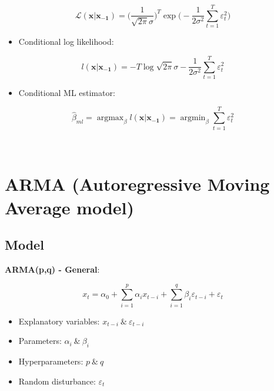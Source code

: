 \documentclass[
]{book}
\providecommand{\tightlist}{%
  \setlength{\itemsep}{0pt}\setlength{\parskip}{0pt}}
\begin{document}
\[\begin{equation*}
        \mathcal{L}(\bm{x|x_{-1}})=\bigg(\frac{1}{\sqrt{2\pi}\sigma}\bigg)^T\exp{\bigg(-\frac{1}{2\sigma^2}\sum_{t=1}^T{\varepsilon_t^2}\bigg)}
    \end{equation*}\]

\begin{itemize}
\tightlist
\item
  Conditional log likelihood:
\end{itemize}

\[\begin{equation*}
        l(\bm{x|x_{-1}})=-T\log{\sqrt{2\pi}\sigma}-\frac{1}{2\sigma^2}\sum_{t=1}^T{\varepsilon_t^2}
    \end{equation*}\]

\begin{itemize}
\tightlist
\item
  Conditional ML estimator:
\end{itemize}

\[\begin{equation*}
        \hat{\beta}_{ml}=\mathop{\mathrm{argmax}}_\beta{l(\bm{x|x_{-1}})}=\mathop{\mathrm{argmin}}_\beta{\sum_{t=1}^T{\varepsilon_t^2}}
    \end{equation*}\]

~

\hypertarget{arma-autoregressive-moving-average-model}{%
\section{ARMA (Autoregressive Moving Average
model)}\label{arma-autoregressive-moving-average-model}}

\hypertarget{model-2}{%
\subsection{Model}\label{model-2}}

\textbf{ARMA(p,q) - General}:

\[\begin{equation*}
        x_t=\alpha_0+\sum_{i=1}^{p}{\alpha_i x_{t-i}}+\sum_{i=1}^{q}{\beta_i \varepsilon_{t-i}}+\varepsilon_t
    \end{equation*}\]

\begin{itemize}
\tightlist
\item
  Explanatory variables: \(x_{t-i}\ \&\ \varepsilon_{t-i}\)
\item
  Parameters: \(\alpha_i\ \&\ \beta_i\)
\item
  Hyperparameters: \(p\ \&\ q\)
\item
  Random disturbance: \(\varepsilon_t\)
\end{itemize}
\end{document}
